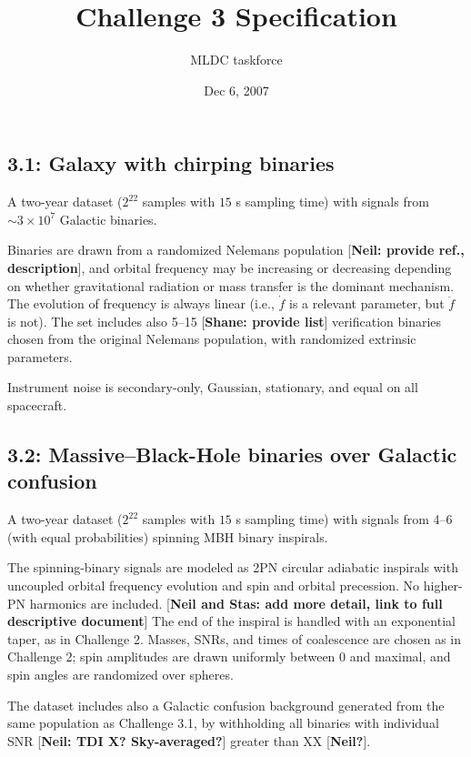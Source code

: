 \documentclass[11pt]{article}
\title{Challenge 3 Specification}
\author{MLDC taskforce}
\date{Dec 6, 2007}
\begin{document}
\maketitle

\subsection*{3.1: Galaxy with chirping binaries}

A two-year dataset ($2^{22}$ samples with $15$ s sampling time) with signals from $\sim 3 \times 10^7$ Galactic binaries.

Binaries are drawn from a randomized Nelemans population [\textbf{Neil: provide ref., description}], and orbital frequency may be increasing or decreasing depending on whether gravitational radiation or mass transfer is the dominant mechanism. The evolution of frequency is always linear (i.e., $\dot{f}$ is a relevant parameter, but $\ddot{f}$ is not). The set includes also 5--15 [\textbf{Shane: provide list}] verification binaries chosen from the original Nelemans population, with randomized extrinsic parameters.

Instrument noise is secondary-only, Gaussian, stationary, and equal on all spacecraft. 

\subsection*{3.2: Massive--Black-Hole binaries over Galactic confusion}

A two-year dataset ($2^{22}$ samples with $15$ s sampling time) with signals from 4--6 (with equal probabilities) spinning MBH binary inspirals.

The spinning-binary signals are modeled as 2PN circular adiabatic inspirals with uncoupled orbital frequency evolution and spin and orbital precession. No higher-PN harmonics are included. [\textbf{Neil and Stas: add more detail, link to full descriptive document}] The end of the inspiral is handled with an exponential taper, as in Challenge 2. Masses, SNRs, and times of coalescence are chosen as in Challenge 2; spin amplitudes are drawn uniformly between 0 and maximal, and spin angles are randomized over spheres.

The dataset includes also a Galactic confusion background generated from the same population as Challenge 3.1, by withholding all binaries with individual SNR [\textbf{Neil: TDI X? Sky-averaged?}] greater than XX [\textbf{Neil?}].
\end{document}
